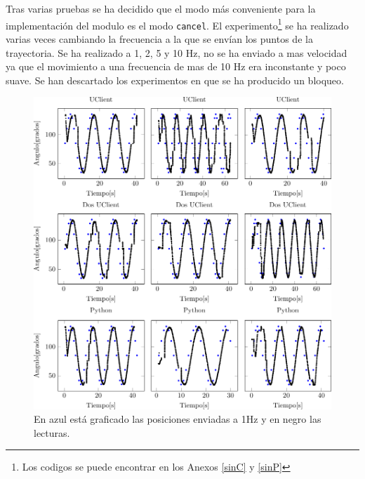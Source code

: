 \documentclass[12pt,a4paper,final,twoside]{book}
\begin{document}
Tras varias pruebas se ha decidido que el modo más conveniente para la implementación del modulo es el modo \texttt{cancel}.
\newpage
El experimento\footnote{Los codigos se puede encontrar en los Anexos \ref{sinC} y \ref{sinP}} se ha realizado varias veces cambiando la frecuencia a la que se envían los puntos de la trayectoria. Se ha realizado a 1, 2, 5 y 10 Hz, no se ha enviado a mas velocidad ya que el movimiento a una frecuencia de mas de 10 Hz era inconstante y poco suave.
Se han descartado los experimentos en que se ha producido un bloqueo.

\begin{figure}[H]
	\centering
    \includegraphics[scale=1]{plots/h1-f1.pdf}
 
   	 \caption{En azul está graficado las posiciones enviadas a 1Hz y en negro las lecturas.}
  \label{fig:sin1H}
\end{figure}
\end{document}
